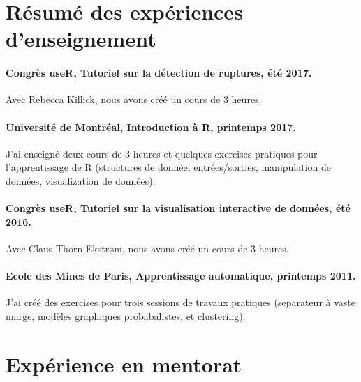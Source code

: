 \documentclass{article}
\begin{document}
\section{Résumé des expériences d'enseignement} 


\paragraph{Congrès useR, Tutoriel sur la détection de ruptures, été
  2017.} Avec Rebecca Killick, nous avons créé un cours de 3 heures.

\paragraph{Universit\'e de Montr\'eal, Introduction à R, printemps
  2017.} J'ai enseigné deux cours de 3 heures et quelques exercises
pratiques pour l'apprentissage de R (structures de donnée, entrées/sorties,
manipulation de données, visualization de données).

\paragraph{Congrès useR, Tutoriel sur la visualisation interactive de données, été 2016.} Avec Claus Thorn Ekstr\o m,
nous avons créé un cours de 3 heures.

\paragraph{Ecole des Mines de Paris, Apprentissage automatique,
  printemps 2011.} J'ai créé des exercises pour trois sessions de
travaux pratiques (separateur à vaste marge, modèles graphiques
probabalistes, et clustering).

\section{Expérience en mentorat}
\end{document}
